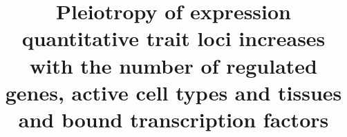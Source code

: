 \documentclass{bmcart}
\begin{document}
    \begin{frontmatter}

        \begin{fmbox}


            \title{Pleiotropy of expression quantitative trait loci increases with the number of regulated genes, active cell types and tissues and bound transcription factors}


            \author[
                addressref={aff1},                   %
                corref={aff1},                       %
                email={aitor.gonzalez@univ-amu.fr}   %
            ]{ }


            \address[id=aff1]{%
                ,          %
                ,                              %
            }


\end{fmbox}
\end{frontmatter}
\end{document}
